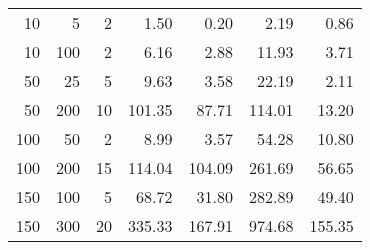 \begin{tabular}{rrrrrrr}
\toprule
  10 &    5 &   2 &   1.50 &   0.20 &   2.19 &   0.86 \\
  10 &  100 &   2 &   6.16 &   2.88 &  11.93 &   3.71 \\
  50 &   25 &   5 &   9.63 &   3.58 &  22.19 &   2.11 \\
  50 &  200 &  10 & 101.35 &  87.71 & 114.01 &  13.20 \\
 100 &   50 &   2 &   8.99 &   3.57 &  54.28 &  10.80 \\
 100 &  200 &  15 & 114.04 & 104.09 & 261.69 &  56.65 \\
 150 &  100 &   5 &  68.72 &  31.80 & 282.89 &  49.40 \\
 150 &  300 &  20 & 335.33 & 167.91 & 974.68 & 155.35 \\
\bottomrule
\end{tabular}
